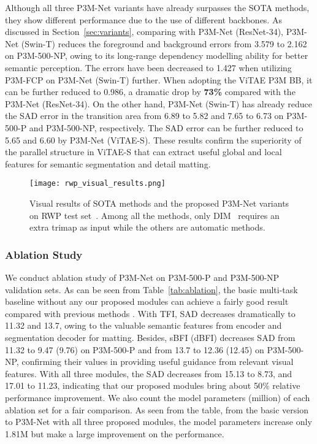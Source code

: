 \documentclass[twocolumn]{svjour3}
\begin{document}
Although all three P3M-Net variants have already surpasses the SOTA methods, they show different performance due to the use of different backbones. As discussed in Section~\ref{sec:variants}, comparing with P3M-Net (ResNet-34), P3M-Net (Swin-T) reduces the foreground and background errors from 3.579 to 2.162 on P3M-500-NP, owing to its long-range dependency modelling ability for better semantic perception. The errors have been decreased to 1.427 when utilizing P3M-FCP on P3M-Net (Swin-T) further. When adopting the ViTAE P3M BB, it can be further reduced to 0.986, a dramatic drop by \textbf{73\%} compared with the P3M-Net (ResNet-34). On the other hand, P3M-Net (Swin-T) has already reduce the SAD error in the transition area from 6.89 to 5.82 and 7.65 to 6.73 on P3M-500-P and P3M-500-NP, respectively. The SAD error can be further reduced to 5.65 and 6.60 by P3M-Net (ViTAE-S). These results confirm the superiority of the parallel structure in ViTAE-S that can extract useful global and local features for semantic segmentation and detail matting.



\begin{figure*}[hbtp]
    \centering
    \texttt{[image: rwp\_visual\_results.png]}
    \caption{Visual results of SOTA methods and the proposed P3M-Net variants on RWP test set~\citep{yu2021mask}. Among all the methods, only DIM~\citep{dim} requires an extra trimap as input while the others are automatic methods.}
    \label{fig:variants_compare_results_realworld}
\end{figure*}

\subsubsection{Ablation Study}
We conduct ablation study of P3M-Net on P3M-500-P and P3M-500-NP validation sets. As can be seen from Table~\ref{tab:ablation}, the basic multi-task baseline without any our proposed modules can achieve a fairly good result compared with previous methods \citep{shm,hatt,lf}. With TFI, SAD decreases dramatically to 11.32 and 13.7, owing to the valuable semantic features from encoder and segmentation decoder for matting. Besides, sBFI (dBFI) decreases SAD from 11.32 to 9.47 (9.76) on P3M-500-P and from 13.7 to 12.36 (12.45) on P3M-500-NP, confirming their values in providing useful guidance from relevant visual features. With all three modules, the SAD decreases from 15.13 to 8.73, and 17.01 to 11.23, indicating that our proposed modules bring about 50\% relative performance improvement. We also count the model parameters (million) of each ablation set for a fair comparison. As seen from the table, from the basic version to P3M-Net with all three proposed modules, the model parameters increase only 1.81M but make a large improvement on the performance.
\end{document}
